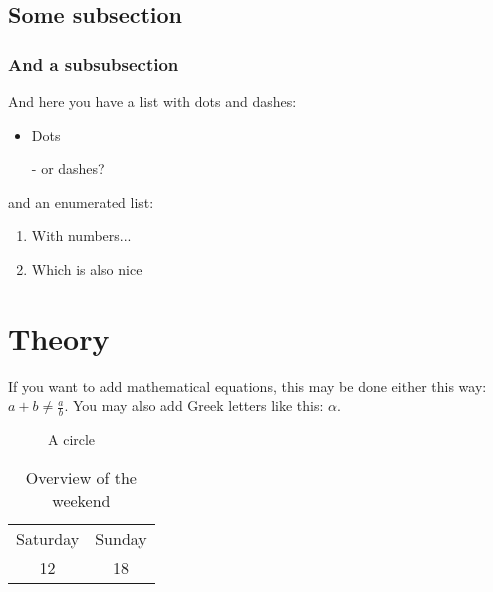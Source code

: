 \documentclass[11pt, a4paper]{article} %
\begin{document}
\blindtext %

\subsection{Some subsection}
\blindtext %

\subsubsection{And a subsubsection}
\blindtext %

And here you have a list with dots and dashes:
\begin{itemize}
    \item Dots 
    \item[-] or dashes?
\end{itemize}

and an enumerated list:

\begin{enumerate}
    \item With numbers...
    \item Which is also nice \Winkey
\end{enumerate}


\section{Theory}

If you want to add mathematical equations, this may be done either this way: $a +  b \neq \frac{a}{b}$. You may also add Greek letters like this: $\alpha$.\\ 

\blindtext %

\begin{figure}[htpb!] %
    \centering %
    \caption{A circle} %
    \label{fig:my_label} %
\end{figure}

\blindtext %

\begin{table}[] %
    \centering
    \begin{tabular}{c|c}
        Saturday & Sunday \\
        12 & 18
    \end{tabular}
    \caption{Overview of the weekend}%
    \label{tab:weekend} %
\end{table}
\end{document}
